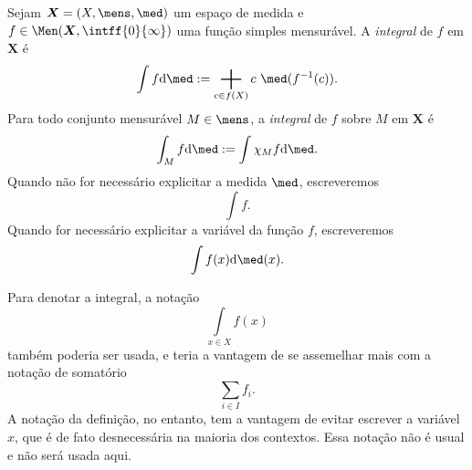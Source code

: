 \begin{defi}
Sejam $\bm X = (X,\mens,\med)$ um espaço de medida e $f\in \Men(\bm X,\intff{0}{\infty})$ uma função simples mensurável.
A \emph{integral} de $f$ em $\bm X$ é
	\begin{equation*}
	\int f \dd\med := \sum_{c \in f(X)} c \ \med(f\inv(c)).
	\end{equation*}
Para todo conjunto mensurável $M \in \mens$, a \emph{integral} de $f$ sobre $M$ em $\bm X$ é
	\begin{equation*}
	\int_M f \dd\med := \int \idc_M f \dd\med.
	\end{equation*}
Quando não for necessário explicitar a medida $\med$, escreveremos
	\begin{equation*}
	\int f.
	\end{equation*}
Quando for necessário explicitar a variável da função $f$, escreveremos
	\begin{equation*}
	\int f(x) \dd \med(x).
	\end{equation*}
\end{defi}

Para denotar a integral, a notação
	\begin{equation*}
	\int\limits_{x \in X} f(x)
	\end{equation*}
também poderia ser usada, e teria a vantagem de se assemelhar mais com a notação de somatório
	\begin{equation*}
	\sum_{i \in I} f_i.
	\end{equation*}
A notação da definição, no entanto, tem a vantagem de evitar escrever a variável $x$, que é de fato desnecessária na maioria dos contextos. Essa notação não é usual e não será usada aqui.

